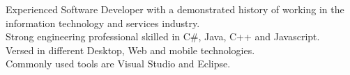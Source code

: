 

\begin{cvparagraph}

Experienced Software Developer with a demonstrated history of working in the information technology and services industry. \\Strong engineering professional skilled in C\#, Java, C++ and Javascript. \\Versed in different Desktop, Web and mobile technologies. \\Commonly used tools are Visual Studio and Eclipse.
\end{cvparagraph}
